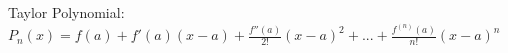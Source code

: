 \documentclass[preview]{standalone}
\begin{document}
\begin{center}
Taylor Polynomial: $P_n(x) = f(a) + f'(a)(x-a) + \frac{f''(a)}{2!}(x-a)^2 + ... + \frac{f^{(n)}(a)}{n!}(x-a)^n$
\end{center}
\end{document}
